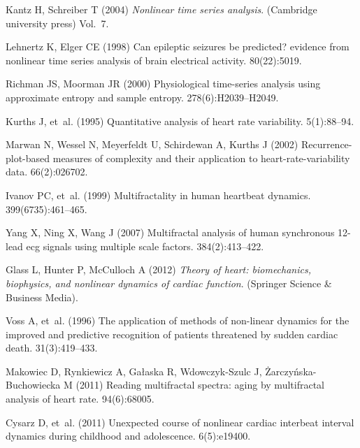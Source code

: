 \documentclass[9pt,twocolumn,twoside]{pnas-new}
\begin{document}
\begin{thebibliography}{10}
Kantz H, Schreiber T (2004) {\em Nonlinear time series analysis}.
\newblock (Cambridge university press) Vol.{}~7.

Lehnertz K, Elger CE (1998) Can epileptic seizures be predicted? evidence from
  nonlinear time series analysis of brain electrical activity.
 80(22):5019.

Richman JS, Moorman JR (2000) Physiological time-series analysis using
  approximate entropy and sample entropy.
  278(6):H2039--H2049.

Kurths J, et~al. (1995) Quantitative analysis of heart rate variability.
  5(1):88--94.

Marwan N, Wessel N, Meyerfeldt U, Schirdewan A, Kurths J (2002)
  Recurrence-plot-based measures of complexity and their application to
  heart-rate-variability data.
 66(2):026702.

Ivanov PC, et~al. (1999) Multifractality in human heartbeat dynamics.
 399(6735):461--465.

Yang X, Ning X, Wang J (2007) Multifractal analysis of human synchronous
  12-lead ecg signals using multiple scale factors.
  384(2):413--422.

Glass L, Hunter P, McCulloch A (2012) {\em Theory of heart: biomechanics,
  biophysics, and nonlinear dynamics of cardiac function}.
\newblock (Springer Science \& Business Media).

Voss A, et~al. (1996) The application of methods of non-linear dynamics for the
  improved and predictive recognition of patients threatened by sudden cardiac
  death.
 31(3):419--433.

Makowiec D, Rynkiewicz A, Ga{\l}aska R, Wdowczyk-Szulc J,
  {\.Z}arczy{\'n}ska-Buchowiecka M (2011) Reading multifractal spectra: aging
  by multifractal analysis of heart rate.
 94(6):68005.

Cysarz D, et~al. (2011) Unexpected course of nonlinear cardiac interbeat
  interval dynamics during childhood and adolescence.
 6(5):e19400.


\end{thebibliography}
\end{document}
